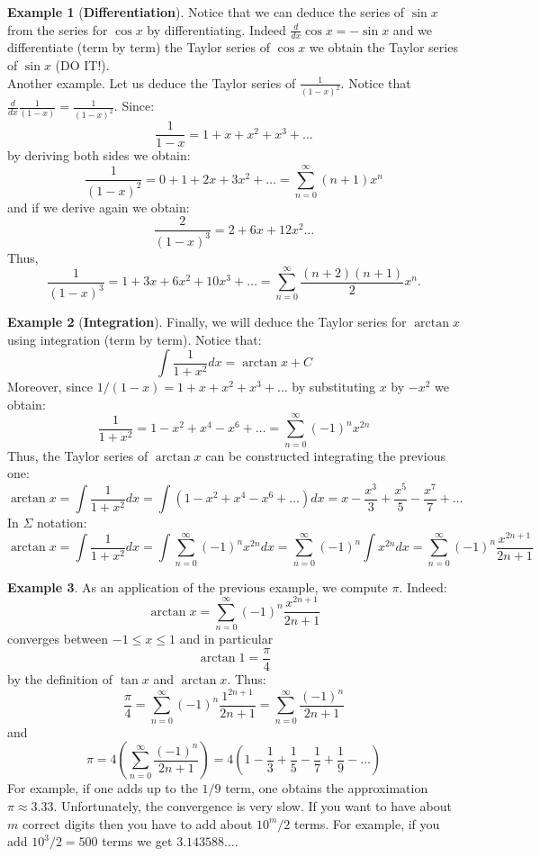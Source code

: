 \documentclass[12pt]{article}
\theoremstyle{definition}
\newtheorem{exa}{Example}
\newcommand{\sumno}{\sum_{n=0}^\infty }
\begin{document}
\begin{exa}[{\bf Differentiation}] Notice that we can deduce the series of $\sin x$ from the series for $\cos x$ by differentiating. Indeed $\frac{d}{dx} \cos x =- \sin x$ and we differentiate (term by term) the Taylor series of $\cos x$ we obtain the Taylor series of $\sin x$ (DO IT!).\\

Another example. Let us deduce the Taylor series of $\frac{1}{(1-x)^2}$. Notice that $\frac{d}{dx} \frac{1}{(1-x)}= \frac{1}{(1-x)^2}$. Since:
$$\frac{1}{1-x}= 1+x+x^2+x^3+\ldots$$
by deriving both sides we obtain:
$$\frac{1}{(1-x)^2}=0+1+2x+3x^2+\ldots=\sumno (n+1)x^n$$
and if we derive again we obtain:
$$\frac{2}{(1-x)^3}=2+6x+12x^2\ldots$$
Thus,
$$\frac{1}{(1-x)^3}=1+3x+6x^2+10x^3+\ldots=\sumno \frac{(n+2)(n+1)}{2}x^n.$$

\end{exa}

\begin{exa}[{\bf Integration}] Finally, we will deduce the Taylor series for $\arctan x$ using integration (term by term). Notice that:
$$\int \frac{1}{1+x^2} dx = \arctan x + C$$
Moreover, since $1/(1-x)=1+x+x^2+x^3+\ldots$ by substituting $x$ by $-x^2$ we obtain:
$$\frac{1}{1+x^2}=1-x^2+x^4-x^6+\ldots=\sumno (-1)^n x^{2n}$$
Thus, the Taylor series of $\arctan x$ can be constructed integrating the previous one:
$$\arctan x = \int \frac{1}{1+x^2} dx = \int (1-x^2+x^4-x^6+\ldots )dx = x -\frac{x^3}{3}+\frac{x^5}{5}-\frac{x^7}{7}+\ldots$$
In $\Sigma$ notation:
$$\arctan x = \int \frac{1}{1+x^2} dx = \int \sumno (-1)^n x^{2n} dx = \sumno (-1)^n \int x^{2n} dx = \sumno (-1)^n \frac{x^{2n+1}}{2n+1}$$
 
\end{exa}


\begin{exa}
As an application of the previous example, we compute $\pi$. Indeed:
$$\arctan x =  \sumno (-1)^n \frac{x^{2n+1}}{2n+1}$$
converges between $-1\leq x\leq 1$ and in particular
$$\arctan 1 = \frac{\pi}{4}$$
by the definition of $\tan x$ and $\arctan x$. Thus:
$$\frac{\pi}{4}=\sumno (-1)^n \frac{1^{2n+1}}{2n+1}=\sumno \frac{(-1)^n}{2n+1}$$
and 
$$\pi = 4\left(\sumno \frac{(-1)^n}{2n+1}\right)=4\left(1-\frac{1}{3}+\frac{1}{5}-\frac{1}{7}+\frac{1}{9}-\ldots\right)$$
For example, if one adds up to the $1/9$ term, one obtains the approximation $\pi\approx 3.33$. Unfortunately, the convergence is very slow. If you want to have about $m$ correct digits then you have to add about $10^m/2$ terms. For example, if you add $10^3/2=500$ terms we get $3.143588\ldots$.
\end{exa}
\end{document}
